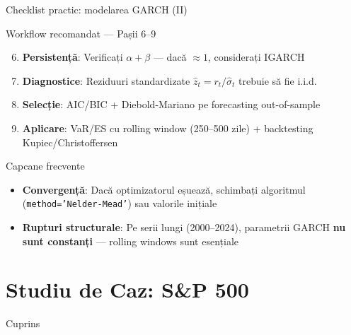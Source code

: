 \documentclass[9pt, aspectratio=169, t]{beamer}
\begin{document}
\begin{frame}{Checklist practic: modelarea GARCH (II)}
    \small
        \begin{block}{Workflow recomandat --- Pașii 6--9}
            \begin{enumerate}\setcounter{enumi}{5}\setlength{\itemsep}{1pt}
                \item \textbf{Persistență}: Verificați $\alpha + \beta$ --- dacă $\approx 1$, considerați IGARCH
                \item \textbf{Diagnostice}: Reziduuri standardizate $\hat{z}_t = r_t / \hat{\sigma}_t$ trebuie să fie i.i.d.
                \item \textbf{Selecție}: AIC/BIC + Diebold-Mariano pe forecasting out-of-sample
                \item \textbf{Aplicare}: VaR/ES cu rolling window (250--500 zile) + backtesting Kupiec/Christoffersen
            \end{enumerate}
        \end{block}
        \vspace{0.1cm}
        \begin{alertblock}{Capcane frecvente}
            \begin{itemize}
                \item \textbf{Convergență}: Dacă optimizatorul eșuează, schimbați algoritmul (\texttt{method='Nelder-Mead'}) sau valorile inițiale
                \item \textbf{Rupturi structurale}: Pe serii lungi (2000--2024), parametrii GARCH \textbf{nu sunt constanți} --- rolling windows sunt esențiale
            \end{itemize}
        \end{alertblock}
\end{frame}
\section{Studiu de Caz: S\&P 500}

\begin{frame}{Cuprins}
    \small
    \vspace{-0.2cm}
    \tableofcontents[currentsection]
\end{frame}
\end{document}
